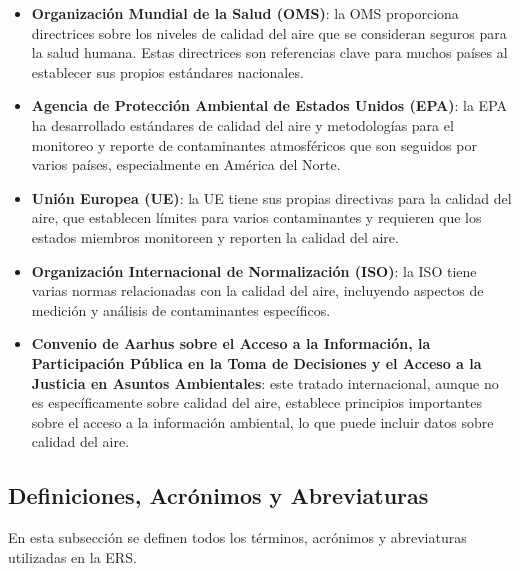 \documentclass[
11pt, %
codirector, %
]{charter}
\begin{document}
\begin{itemize}
	\begin{itemize}
		\item \textbf{Organización Mundial de la Salud (OMS)}: la OMS proporciona directrices sobre los niveles de calidad del aire que se consideran seguros para la salud humana. Estas directrices son referencias clave para muchos países al establecer sus propios estándares nacionales.
		\item \textbf{Agencia de Protección Ambiental de Estados Unidos (EPA)}: la EPA ha desarrollado estándares de calidad del aire y metodologías para el monitoreo y reporte de contaminantes atmosféricos que son seguidos por varios países, especialmente en América del Norte.
		\item \textbf{Unión Europea (UE)}: la UE tiene sus propias directivas para la calidad del aire, que establecen límites para varios contaminantes y requieren que los estados miembros monitoreen y reporten la calidad del aire.
		\item \textbf{Organización Internacional de Normalización (ISO)}: la ISO tiene varias normas relacionadas con la calidad del aire, incluyendo aspectos de medición y análisis de contaminantes específicos.
		\item \textbf{Convenio de Aarhus sobre el Acceso a la Información, la Participación Pública en la Toma de Decisiones y el Acceso a la Justicia en Asuntos Ambientales}: este tratado internacional, aunque no es específicamente sobre calidad del aire, establece principios importantes sobre el acceso a la información ambiental, lo que puede incluir datos sobre calidad del aire.
	\end{itemize} 
\end{itemize}


\subsection{Definiciones, Acrónimos y Abreviaturas}
\label{sec:orgb158e36}

En esta subsección se definen todos los términos, acrónimos y
abreviaturas utilizadas en la ERS.
\end{document}
